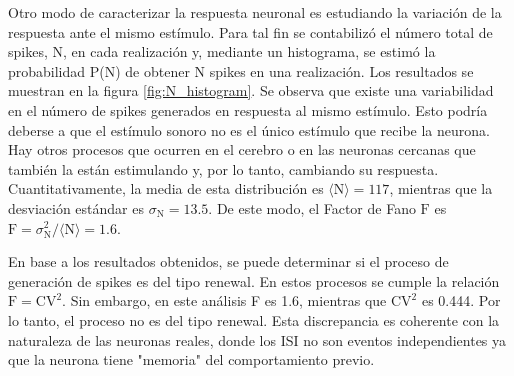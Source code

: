 \documentclass[aps,prb,twocolumn,superscriptaddress,floatfix,longbibliography]{revtex4-2}
\begin{document}
Otro modo de caracterizar la respuesta neuronal es estudiando la variación de la respuesta ante el mismo estímulo. Para tal fin se contabilizó el número total de spikes, N, en cada realización y, mediante un histograma, se estimó la probabilidad P(N) de obtener N spikes en una realización. Los resultados se muestran en la figura \ref{fig:N_histogram}. Se observa que existe una variabilidad en el número de spikes generados en respuesta al mismo estímulo. Esto podría deberse a que el estímulo sonoro no es el único estímulo que recibe la neurona. Hay otros procesos que ocurren en el cerebro o en las neuronas cercanas que también la están estimulando y, por lo tanto, cambiando su respuesta. Cuantitativamente, la media de esta distribución es $\langle \mathrm{N} \rangle = 117$, mientras que la desviación estándar es $\sigma_{\mathrm{N}} = 13.5$. De este modo, el Factor de Fano $\mathrm{F}$ es $\mathrm{F} =  \sigma_\mathrm{N}^2/\langle \mathrm{N} \rangle = 1.6$.

En base a los resultados obtenidos, se puede determinar si el proceso de generación de spikes es del tipo renewal. En estos procesos se cumple la relación $\mathrm{F} = \mathrm{CV}^2$. Sin embargo, en este análisis F es 1.6, mientras que $\mathrm{CV}^2$ es 0.444. Por lo tanto, el proceso no es del tipo renewal. Esta discrepancia es coherente con la naturaleza de las neuronas reales, donde los ISI no son eventos independientes ya que la neurona tiene "memoria" del comportamiento previo.
\end{document}
